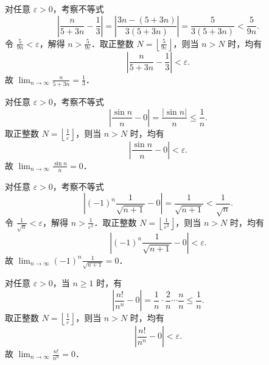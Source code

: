 \begin{myproof}

    对任意 $\varepsilon > 0$，考察不等式
    \begin{equation}
        \left| \frac{n}{5 + 3n} - \frac{1}{3} \right| = \left| \frac{3n - (5 + 3n)}{3(5 + 3n)} \right| = \frac{5}{3(5 + 3n)} < \frac{5}{9n}.
    \end{equation}
    令 $\frac{5}{9n} < \varepsilon$，解得 $n > \frac{5}{9\varepsilon}$．取正整数 $N = \left\lfloor \frac{5}{9\varepsilon} \right\rfloor$，则当 $n > N$ 时，均有
    \begin{equation}
        \left| \frac{n}{5 + 3n} - \frac{1}{3} \right| < \varepsilon.
    \end{equation}
    故 $\lim_{n\to\infty} \frac{n}{5 + 3n} = \frac{1}{3}$．


    对任意 $\varepsilon > 0$，考察不等式
    \begin{equation}
        \left| \frac{\sin n}{n} - 0 \right| = \frac{|\sin n|}{n} \leqslant \frac{1}{n}.
    \end{equation}
    取正整数 $N = \left\lfloor \frac{1}{\varepsilon} \right\rfloor$，则当 $n > N$ 时，均有
    \begin{equation}
        \left| \frac{\sin n}{n} - 0 \right| < \varepsilon.
    \end{equation}
    故 $\lim_{n\to\infty} \frac{\sin n}{n} = 0$．


    对任意 $\varepsilon > 0$，考察不等式
    \begin{equation}
        \left| (-1)^n \frac{1}{\sqrt{n + 1}} - 0 \right| = \frac{1}{\sqrt{n + 1}} < \frac{1}{\sqrt{n}}.
    \end{equation}
    令 $\frac{1}{\sqrt{n}} < \varepsilon$，解得 $n > \frac{1}{\varepsilon^2}$．取正整数 $N = \left\lfloor \frac{1}{\varepsilon^2} \right\rfloor$，则当 $n > N$ 时，均有
    \begin{equation}
        \left| (-1)^n \frac{1}{\sqrt{n + 1}} - 0 \right| < \varepsilon.
    \end{equation}
    故 $\lim_{n\to\infty} (-1)^n \frac{1}{\sqrt{n + 1}} = 0$．


    对任意 $\varepsilon > 0$，当 $n \geqslant 1$ 时，有
    \begin{equation}
        \left| \frac{n!}{n^n} - 0 \right| = \frac{1}{n} \cdot \frac{2}{n} \cdots \frac{n}{n} \leqslant \frac{1}{n}.
    \end{equation}
    取正整数 $N = \left\lfloor \frac{1}{\varepsilon} \right\rfloor$，则当 $n > N$ 时，均有
    \begin{equation}
        \left| \frac{n!}{n^n} - 0 \right| < \varepsilon.
    \end{equation}
    故 $\lim_{n\to\infty} \frac{n!}{n^n} = 0$．
\end{myproof}

